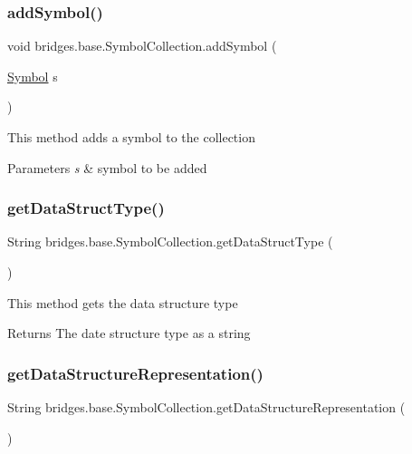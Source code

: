 \subsubsection{\texorpdfstring{add\+Symbol()}{addSymbol()}}
{\footnotesize\ttfamily void bridges.\+base.\+Symbol\+Collection.\+add\+Symbol (\begin{DoxyParamCaption}\item[{\hyperlink{classbridges_1_1base_1_1_symbol}{Symbol}}]{s }\end{DoxyParamCaption})}

This method adds a symbol to the collection 
\begin{DoxyParams}{Parameters}
{\em s} & symbol to be added \\
\hline
\end{DoxyParams}
\mbox{\label{classbridges_1_1base_1_1_symbol_collection_afbc928d2e6818edec96d10f52feebacb}} 
\subsubsection{\texorpdfstring{get\+Data\+Struct\+Type()}{getDataStructType()}}
{\footnotesize\ttfamily String bridges.\+base.\+Symbol\+Collection.\+get\+Data\+Struct\+Type (\begin{DoxyParamCaption}{ }\end{DoxyParamCaption})}

This method gets the data structure type

\begin{DoxyReturn}{Returns}
The date structure type as a string 
\end{DoxyReturn}
\mbox{\label{classbridges_1_1base_1_1_symbol_collection_a706ad8a7bcf12c194403ac3281c73674}} 
\subsubsection{\texorpdfstring{get\+Data\+Structure\+Representation()}{getDataStructureRepresentation()}}
{\footnotesize\ttfamily String bridges.\+base.\+Symbol\+Collection.\+get\+Data\+Structure\+Representation (\begin{DoxyParamCaption}{ }\end{DoxyParamCaption})}

